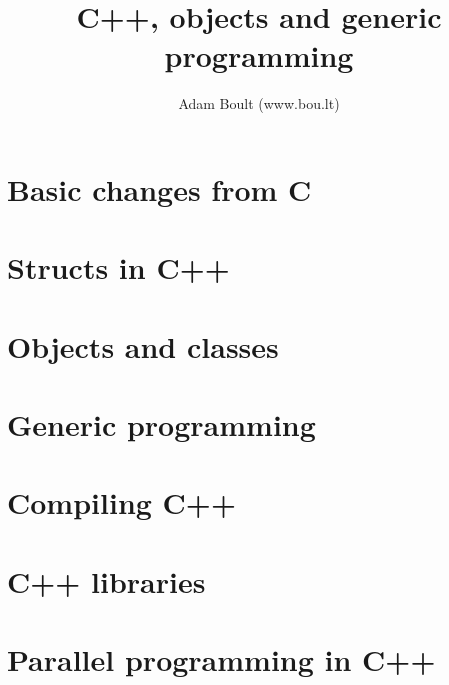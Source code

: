 \documentclass[oneside]{book}
\begin{document}
\author{Adam Boult (www.bou.lt)}
\title{C++, objects and generic programming}
\maketitle

\setcounter{tocdepth}{0}
\tableofcontents



\part{Basic changes from C}








\part{Structs in C++}




\part{Objects and classes}



\part{Generic programming}




\part{Compiling C++}



\part{C++ libraries}




\part{Parallel programming in C++}
\end{document}
